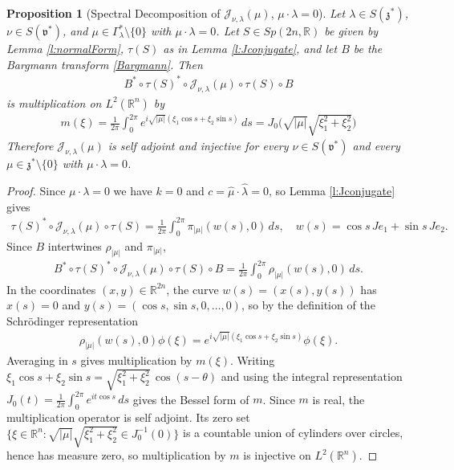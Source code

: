\documentclass[11pt]{amsart}
\theoremstyle{plain}
\newtheorem{proposition}[theorem]{Proposition}
\theoremstyle{definition}
\theoremstyle{remark}
\numberwithin{equation}{section}
\def\fz{\mathfrak{z}}
\def\fv{\mathfrak{v}}
\def\cJ{\mathcal{J}}
\def\mz{\setminus\{0\}}
\def\R{{\mathbb R}}%
\numberwithin{equation}{section}
\begin{document}
\begin{proposition}[Spectral Decomposition of $\cJ_{\nu, \lambda}(\mu)$, $\mu\cdot\lambda= 0$]\label{p:specDecompPerp}
    Let $\lambda\in S(\fz^*)$, $\nu\in S(\fv^*)$, and $\mu\in \Gamma_\lambda^*\mz$ with $\mu\cdot\lambda=0$. Let $S\in Sp(2n, \R)$ be given by Lemma \ref{l:normalForm},  $\tau(S)$ as in Lemma \ref{l:Jconjugate}, and let $B$ be the Bargmann transform \eqref{Bargmann}. Then
    \begin{align*}
        B^*\circ \tau(S)^*\circ\cJ_{\nu, \lambda}(\mu)\circ\tau(S)\circ B
    \end{align*}
    is multiplication on $L^2(\R^n)$ by
	\begin{align*}
		m(\xi)=\frac{1}{2\pi}\int_0^{2\pi}e^{i\sqrt{|\mu|}(\xi_1\cos s+\xi_2\sin s)}\, ds=J_0\big(\sqrt{|\mu|}\sqrt{\xi_1^2+\xi_2^2}\big)
	\end{align*}
	Therefore $\cJ_{\nu, \lambda}(\mu)$ is self adjoint and injective for every $\nu\in S(\fv^*)$ and every $\mu\in \fz^*\mz$ with $\mu\cdot \lambda=0$.
\end{proposition}
\begin{proof}
	Since $\mu\cdot\lambda=0$ we have $k=0$ and $c=\hat{\mu}\cdot\hat{\lambda}=0$, so Lemma \ref{l:Jconjugate} gives
	\begin{align*}
		\tau(S)^*\circ\cJ_{\nu, \lambda}(\mu)\circ\tau(S)=\frac{1}{2\pi}\int_0^{2\pi}\pi_{|\mu|}(w(s), 0)\, ds, \quad w(s)=\cos s\, Je_1+\sin s\, Je_2.
	\end{align*}
	Since $B$ intertwines $\rho_{|\mu|}$ and $\pi_{|\mu|}$,
	\begin{align*}
		B^*\circ\tau(S)^*\circ\cJ_{\nu, \lambda}(\mu)\circ\tau(S)\circ B=\frac{1}{2\pi}\int_0^{2\pi}\rho_{|\mu|}(w(s), 0)\, ds.
	\end{align*}
	In the coordinates $(x, y)\in \R^{2n}$, the curve $w(s)=(x(s), y(s))$ has $x(s)=0$ and $y(s)=(\cos s, \sin s, 0, \ldots, 0)$, so by the definition of the Schr\"{o}dinger representation
	\begin{align*}
		\rho_{|\mu|}(w(s), 0)\phi(\xi)=e^{i\sqrt{|\mu|}(\xi_1\cos s+\xi_2\sin s)}\phi(\xi).
	\end{align*}
	Averaging in $s$ gives multiplication by $m(\xi)$. Writing $\xi_1\cos s+\xi_2\sin s=\sqrt{\xi_1^2+\xi_2^2}\,\cos(s-\theta)$ and using the integral representation $J_0(t)=\frac{1}{2\pi}\int_0^{2\pi}e^{it\cos s}\, ds$ gives the Bessel form of $m$. Since $m$ is real, the multiplication operator is self adjoint. Its zero set $\{\xi\in \R^n: \sqrt{|\mu|}\sqrt{\xi_1^2+\xi_2^2}\in J_0^{-1}(0)\}$ is a countable union of cylinders over circles, hence has measure zero, so multiplication by $m$ is injective on $L^2(\R^n)$.
\end{proof}
\end{document}
